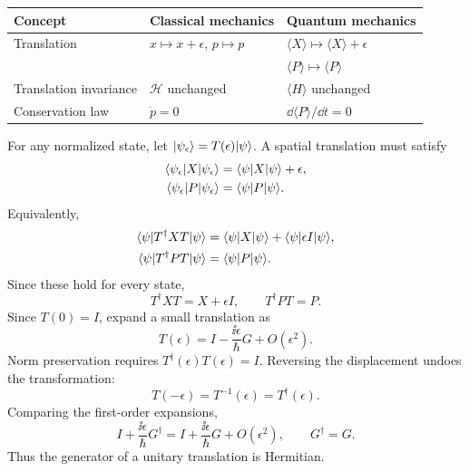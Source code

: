 \begin{center}
\begin{tabular}{lll}
\toprule
Concept & Classical mechanics & Quantum mechanics\\
\midrule
Translation & $x\mapsto x+\epsilon$, $p\mapsto p$
 & $\langle X\rangle\mapsto\langle X\rangle+\epsilon$\\
 & & $\langle P\rangle\mapsto\langle P\rangle$\\
Translation invariance & $\mathcal H$ unchanged & $\langle H\rangle$ unchanged\\
Conservation law & $\dot p=0$ & $\dd\langle P\rangle/\dd t=0$\\
\bottomrule
\end{tabular}
\end{center}
For any normalized state, let $\lvert \psi_\epsilon\rangle=T(\epsilon)\lvert \psi\rangle$.
A spatial translation must satisfy
\begin{align*}
 \langle \psi_\epsilon\rvert X\lvert \psi_\epsilon\rangle&=\langle \psi\rvert X\lvert \psi\rangle+\epsilon,\\
 \langle \psi_\epsilon\rvert P\lvert \psi_\epsilon\rangle&=\langle \psi\rvert P\lvert \psi\rangle.
\end{align*}
Equivalently,
\begin{align*}
 \langle \psi\rvert T^\dagger XT\lvert \psi\rangle
 &=\langle \psi\rvert X\lvert \psi\rangle+\langle \psi\rvert \epsilon I\lvert \psi\rangle,\\
 \langle \psi\rvert T^\dagger PT\lvert \psi\rangle&=\langle \psi\rvert P\lvert \psi\rangle.
\end{align*}
Since these hold for every state,
\[
 T^\dagger XT=X+\epsilon I,\qquad T^\dagger PT=P.
\]
Since $T(0)=I$, expand a small translation as
\[
 T(\epsilon)=I-\frac{\ii\epsilon}{\hbar}G+O(\epsilon^2).
\]
Norm preservation requires $T^\dagger(\epsilon)T(\epsilon)=I$.
Reversing the displacement undoes the transformation:
\[
 T(-\epsilon)=T^{-1}(\epsilon)=T^\dagger(\epsilon).
\]
Comparing the first-order expansions,
\[
 I+\frac{\ii\epsilon}{\hbar}G^\dagger
 =I+\frac{\ii\epsilon}{\hbar}G+O(\epsilon^2),
 \qquad G^\dagger=G.
\]
Thus the generator of a unitary translation is Hermitian.
